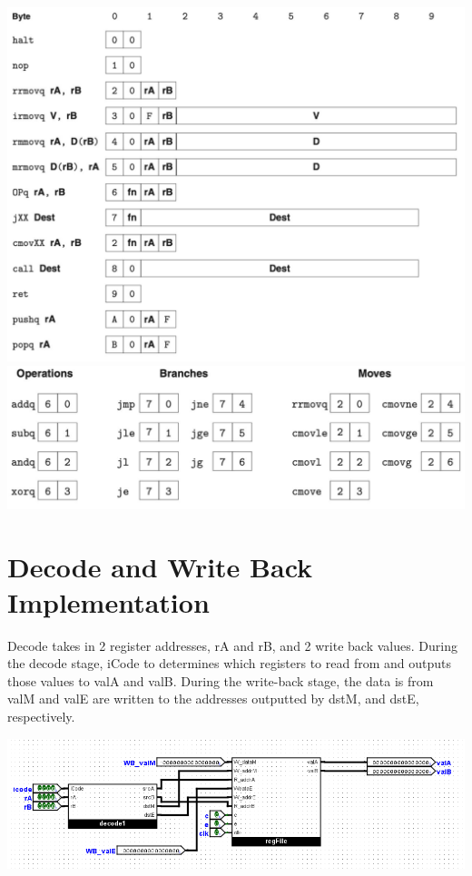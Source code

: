 \documentclass{article}
\begin{document}
\begin{center}
    \includegraphics[scale=.6]{icode.png} \\
    \includegraphics[scale=.8]{ops.png} 
\end{center}
\section{Decode and Write Back Implementation}
Decode takes in 2 register addresses, rA and rB, and 2 write back values. During the decode stage, iCode to determines which registers to read from and outputs those values to valA and valB. During the write-back stage, the data is from valM and valE are written to the addresses outputted by dstM, and dstE, respectively. 
\begin{center}
    \includegraphics[scale=.6]{decode.png} \\
\end{center}
\end{document}
